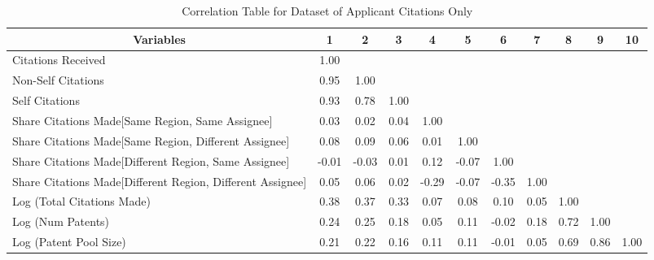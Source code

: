 \begin{center}
\begin{table}[htbp]\centering \caption{Correlation Table for Dataset of Applicant Citations Only \label{a.corrtable}}
\scriptsize
\singlespacing
\begin{adjustbox}{angle=0}
\begin{tabular}{l  c  c  c  c  c  c  c  c  c  c }

\hline
\multicolumn{1}{c}{Variables} &1&2&3&4&5&6&7&8&9&10\\ \hline
Citations Received&1.00\\
Non-Self Citations&0.95&1.00\\
Self Citations&0.93&0.78&1.00\\
Share Citations Made[Same Region, Same Assignee]&0.03&0.02&0.04&1.00\\
Share Citations Made[Same Region, Different Assignee]&0.08&0.09&0.06&0.01&1.00\\
Share Citations Made[Different Region, Same Assignee]&-0.01&-0.03&0.01&0.12&-0.07&1.00\\
Share Citations Made[Different Region, Different Assignee]&0.05&0.06&0.02&-0.29&-0.07&-0.35&1.00\\
Log (Total Citations Made)&0.38&0.37&0.33&0.07&0.08&0.10&0.05&1.00\\
Log (Num Patents)&0.24&0.25&0.18&0.05&0.11&-0.02&0.18&0.72&1.00\\
Log (Patent Pool Size)&0.21&0.22&0.16&0.11&0.11&-0.01&0.05&0.69&0.86&1.00\\ \hline
\end{tabular}
\end{adjustbox}
\end{table}
\end{center}